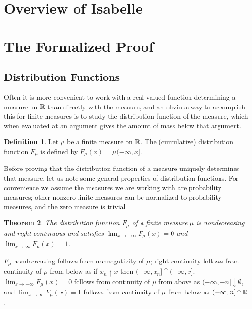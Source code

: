 \documentclass{amsart}
\newtheorem{theorem}{Theorem}[section]
\theoremstyle{definition}
\newtheorem{definition}[theorem]{Definition}
\theoremstyle{remark}
\begin{document}
\section{Overview of Isabelle}

\section{The Formalized Proof}

\subsection{Distribution Functions}

Often it is more convenient to work with a real-valued function determining a measure on $\mathbb{R}$ than directly with the measure, and an obvious way to accomplish this for finite measures is to study the distribution function of the measure, which when evaluated at an argument gives the amount of mass below that argument.

\begin{definition}
Let $\mu$ be a finite measure on $\mathbb{R}$. The (cumulative) distribution function $F_\mu$ is defined by $F_\mu(x) = \mu (-\infty, x]$.
\end{definition}

Before proving that the distribution function of a measure uniquely determines that measure, let us note some general properties of distribution functions. For convenience we assume the measures we are working with are probability measures; other nonzero finite measures can be normalized to probability measures, and the zero measure is trivial.

\begin{theorem}
The distribution function $F_\mu$ of a finite measure $\mu$ is nondecreasing and right-continuous and satisfies $\lim_{x \rightarrow -\infty} F_\mu(x) = 0$ and $\lim_{x \rightarrow \infty} F_\mu(x) = 1$.
\end{theorem}

$F_\mu$ nondecreasing follows from nonnegativity of $\mu$; right-continuity follows from continuity of $\mu$ from below as if $x_n \uparrow x$ then $(-\infty
, x_n] \uparrow (-\infty, x]$. $\lim_{x \rightarrow -\infty} F_\mu(x) = 0$ follows from continuity of $\mu$ from above as $(-\infty, -n] \downarrow \emptyset$, and $\lim_{x \rightarrow \infty} F_\mu(x) = 1$ follows from continuity of $\mu$ from below as $(-\infty, n] \uparrow \mathbb{R}$.

\end{document}
